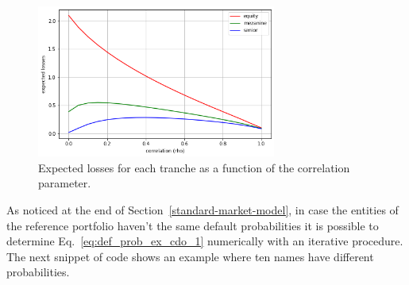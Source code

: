 \begin{figure}[htb]
	\centering
	\includegraphics[width=0.7\textwidth]{figures/losses_vs_rho}
	\caption{Expected losses for each tranche as a function of the correlation parameter.}
	\label{fig:losses_rho}
\end{figure}

As noticed at the end of Section~\ref{standard-market-model}, in case the entities of the reference portfolio haven't the same default probabilities it is possible to determine Eq.~\ref{eq:def_prob_ex_cdo_1} numerically with an iterative procedure. The next snippet of code shows an example where ten names have different probabilities.

